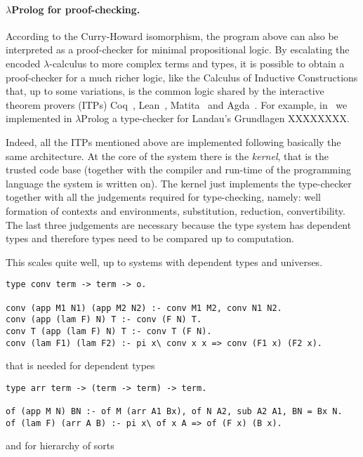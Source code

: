 \documentclass{easychair}
\begin{document}
\paragraph{$\lambda$Prolog for proof-checking.}

According to the Curry-Howard isomorphism, the program above can also
be interpreted as a proof-checker for minimal propositional logic. By
escalating the encoded $\lambda$-calculus to more complex terms and
types, it is possible to obtain a proof-checker for a much richer
logic, like the Calculus of Inductive Constructions that, up to some
variations, is the common logic shared by the interactive theorem
provers (ITPs) Coq~\cite{}, Lean~\cite{}, Matita~\cite{} and
Agda~\cite{}. For example, in~\cite{us} we implemented in
$\lambda$Prolog a type-checker for Landau's Grundlagen XXXXXXXX.

Indeed, all the ITPs mentioned above are implemented following
basically the same architecture. At the core of the system there is
the \emph{kernel}, that is the trusted code base (together with the
compiler and run-time of the programming language the system is
written on). The kernel just implements the type-checker together with
all the judgements required for type-checking, namely: well formation
of contexts and environments, substitution, reduction, convertibility.
The last three judgements are necessary because the type system has
dependent types and therefore types need to be compared up to
computation.

This scales quite well, up to systems with dependent types and
universes.

\begin{verbatim}
type conv term -> term -> o.

conv (app M1 N1) (app M2 N2) :- conv M1 M2, conv N1 N2.
conv (app (lam F) N) T :- conv (F N) T.
conv T (app (lam F) N) T :- conv T (F N).
conv (lam F1) (lam F2) :- pi x\ conv x x => conv (F1 x) (F2 x).
\end{verbatim}

\noindent
that is needed for dependent types

\begin{verbatim}
type arr term -> (term -> term) -> term.

of (app M N) BN :- of M (arr A1 Bx), of N A2, sub A2 A1, BN = Bx N.
of (lam F) (arr A B) :- pi x\ of x A => of (F x) (B x).
\end{verbatim}

\noindent
and for hierarchy of sorts
\end{document}
